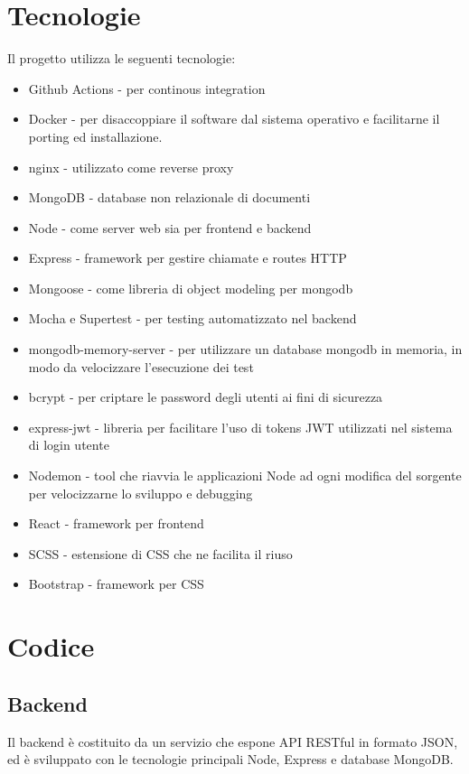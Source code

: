 \documentclass{report}
\begin{document}
\section{Tecnologie}
Il progetto utilizza le seguenti tecnologie:
\begin{itemize}
    \item Github Actions - per continous integration
    \item Docker - per disaccoppiare il software dal sistema operativo e facilitarne il porting ed installazione.
    \item nginx - utilizzato come reverse proxy
    \item MongoDB - database non relazionale di documenti
    \item Node - come server web sia per frontend e backend
    \item Express - framework per gestire chiamate e routes HTTP
    \item Mongoose - come libreria di object modeling per mongodb
    \item Mocha e Supertest - per testing automatizzato nel backend
    \item mongodb-memory-server - per utilizzare un database mongodb in memoria, in modo da velocizzare l'esecuzione dei test
    \item bcrypt - per criptare le password degli utenti ai fini di sicurezza
    \item express-jwt - libreria per facilitare l'uso di tokens JWT utilizzati nel sistema di login utente
    \item Nodemon - tool che riavvia le applicazioni Node ad ogni modifica del sorgente
    per velocizzarne lo sviluppo e debugging
    \item React - framework per frontend
    \item SCSS - estensione di CSS che ne facilita il riuso
    \item Bootstrap - framework per CSS
\end{itemize}

\section{Codice}
\subsection{Backend}
Il backend è costituito da un servizio che espone API RESTful in formato JSON, ed è sviluppato con le tecnologie principali
Node, Express e database MongoDB.
\end{document}
